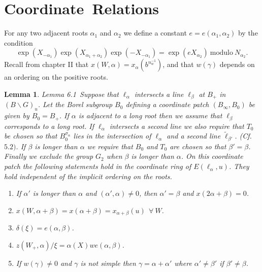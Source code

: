 \documentclass{memo-l}
\newtheorem{lemma}[theorem]{Lemma}
\theoremstyle{definition}
\theoremstyle{remark}
\numberwithin{section}{chapter}
\numberwithin{equation}{chapter}
\begin{document}
\section{Coordinate\ Relations}


   For any two adjacent roots ${\alpha}_{1}$ and ${\alpha}_{2}$ we define a
constant $e = e({\alpha}_{1},{\alpha}_{2})$ by the condition
$$
\exp(X_{-{\alpha}_{1}})\exp(X_{{\alpha}_{1}+{\alpha}_{2}}) 
\exp(-X_{-{\alpha}_{1}}) = \exp(eX_{{\alpha}_{2}})\ {\text{modulo}}\
N_{{\alpha}_{2}}.
$$
Recall from chapter II that $x(W,{\alpha}) = x_{{\alpha}}(b^{n_{w}^{-1}})$, 
and that $w({\gamma})$ depends on an ordering on the
positive roots.
 
\medpagebreak

\begin{lemma}{Lemma 6.1}\ Suppose that ${\ell}_{{\alpha}}$ intersects a
line ${\ell}_{{\beta}}$ at $B_{+}$ in $(B\backslash G)_{u}$.  Let the Borel
subgroup $B_{0}$ defining a coordinate patch $(B_{{\infty}},B_{0})$ be
given by $B_{0} = B_{+}$.  If ${\alpha}$ is adjacent to a long root then we
assume that ${\ell}_{{\beta}}$ corresponds to a long root.  If
${\ell}_{{\alpha}}$ intersects a second line we also require that $T_{0}$
be chosen so that $B_{0}^{{\sigma}_{{\alpha}}}$ lies in the
intersection of ${\ell}_{{\alpha}}$ and a second line $\tilde{\ell}
_{{\beta}'}$.  (Cf.  $5.2)$.  If ${\beta}$ is longer than ${\alpha}$ we
require that $B_{0}$ and $T_{0}$ are chosen so that ${\beta}'={\beta}$.
Finally we exclude the group $G_{2}$ when ${\beta}$ is longer than
${\alpha}$.  On this coordinate patch the following statements hold in the
coordinate ring of $E({\ell}_{{\alpha}},u)$.  They hold independent of
the implicit ordering on the roots.

\smallskip 
\begin{enumerate}[label=\alph*)]
\item If ${\alpha}'$ is longer than ${\alpha}$ and $({\alpha}',{\alpha}) \ne
0$, then ${\alpha}' = {\beta}$ and $x(2{\alpha}+{\beta}) = 0$.

\item
$x(W,{\alpha}+{\beta}) = x({\alpha}+{\beta}) = x_{{\alpha}+{\beta}}(u)\
{\ \forall\ } W$.

\item
${\delta}({\xi}) = e({\alpha},{\beta})$.

\item
$z(W_{+},{\alpha})/{\xi} = {\alpha}(X)we({\alpha},{\beta})$.

\item
If $w({\gamma})\ne 0$ and ${\gamma}$ is not simple then
${\gamma} = {\alpha}+{\alpha}'$ where ${\alpha}' \ne {\beta}'$ if ${\beta}' \ne
{\beta}$.


\end{enumerate}
\end{lemma}
\end{document}
